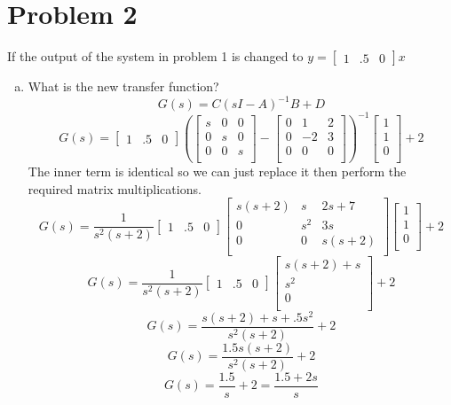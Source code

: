 \documentclass{article}
\begin{document}
\newpage
\section*{Problem 2}
If the output of the system in problem 1 is changed to $ y = \begin{bmatrix} 1 & .5 & 0 \end{bmatrix}x$
\begin{enumerate}[a.]
\item What is the new transfer function?
\newline
$$ G(s) = C(sI-A)^{-1}B + D $$
$$
G(s) =
\begin{bmatrix} 1 & .5 & 0 \end{bmatrix}
(
\begin{bmatrix}
s & 0 & 0 \\
0 & s & 0 \\
0 & 0 & s \\
\end{bmatrix}
-
\begin{bmatrix}
0 &  1 & 2 \\
0 & -2 & 3 \\
0 &  0 & 0 \\
\end{bmatrix}
)
^{-1}
\begin{bmatrix}
1 \\
1 \\
0 \\
\end{bmatrix}
+ 2
$$
The inner term is identical so we can just replace it then perform the required matrix multiplications.
$$
G(s) =
\frac{1}{s^2(s+2)}
\begin{bmatrix} 1 & .5 & 0 \end{bmatrix}
\begin{bmatrix}
s(s+2) & s   & 2s+7 \\
0      & s^2 & 3s \\
0      & 0   & s(s+2) \\
\end{bmatrix}
\begin{bmatrix}
1 \\
1 \\
0 \\
\end{bmatrix}
+ 2
$$
$$
G(s) =
\frac{1}{s^2(s+2)}
\begin{bmatrix} 1 & .5 & 0 \end{bmatrix}
\begin{bmatrix}
s(s+2) + s  \\
s^2         \\
0           \\
\end{bmatrix}
+ 2
$$
$$
G(s) =
\frac{s(s+2) + s  + .5 s^2}{s^2(s+2)}
+ 2
$$
$$
G(s) =
\frac{1.5s(s+ 2)}{s^2(s+2)}
+ 2
$$
$$ G(s) = \frac{1.5}{s} + 2 =  \frac{1.5 + 2s}{s}$$


\end{enumerate}
\end{document}
